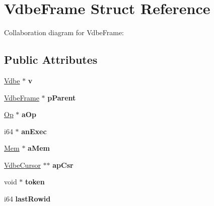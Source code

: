 \hypertarget{structVdbeFrame}{}\section{Vdbe\+Frame Struct Reference}
\label{structVdbeFrame}


Collaboration diagram for Vdbe\+Frame\+:
\subsection*{Public Attributes}
\begin{DoxyCompactItemize}
\item 
\hyperlink{structVdbe}{Vdbe} $\ast$ {\bfseries v}\hypertarget{structVdbeFrame_a2f6258356959c94398d1d006a740c4ce}{}\label{structVdbeFrame_a2f6258356959c94398d1d006a740c4ce}

\item 
\hyperlink{structVdbeFrame}{Vdbe\+Frame} $\ast$ {\bfseries p\+Parent}\hypertarget{structVdbeFrame_afb11d8aa920f34720333f52737375d59}{}\label{structVdbeFrame_afb11d8aa920f34720333f52737375d59}

\item 
\hyperlink{structVdbeOp}{Op} $\ast$ {\bfseries a\+Op}\hypertarget{structVdbeFrame_a0e5670c52e8eeb7e66bf1e3bff8ce2b5}{}\label{structVdbeFrame_a0e5670c52e8eeb7e66bf1e3bff8ce2b5}

\item 
i64 $\ast$ {\bfseries an\+Exec}\hypertarget{structVdbeFrame_aed133c8d63e9c5dd3dedaff47984b467}{}\label{structVdbeFrame_aed133c8d63e9c5dd3dedaff47984b467}

\item 
\hyperlink{structMem}{Mem} $\ast$ {\bfseries a\+Mem}\hypertarget{structVdbeFrame_a98b9eabf633e77d4ae2dfe9d13a43fdf}{}\label{structVdbeFrame_a98b9eabf633e77d4ae2dfe9d13a43fdf}

\item 
\hyperlink{structVdbeCursor}{Vdbe\+Cursor} $\ast$$\ast$ {\bfseries ap\+Csr}\hypertarget{structVdbeFrame_a5d373b3a195dbd1a31f5aa0dbe1822ee}{}\label{structVdbeFrame_a5d373b3a195dbd1a31f5aa0dbe1822ee}

\item 
void $\ast$ {\bfseries token}\hypertarget{structVdbeFrame_a11de10011ea2164995c6b616bba8a576}{}\label{structVdbeFrame_a11de10011ea2164995c6b616bba8a576}

\item 
i64 {\bfseries last\+Rowid}\hypertarget{structVdbeFrame_af655193217fb53c7acab9d24c94344aa}{}\label{structVdbeFrame_af655193217fb53c7acab9d24c94344aa}


\end{DoxyCompactItemize}
